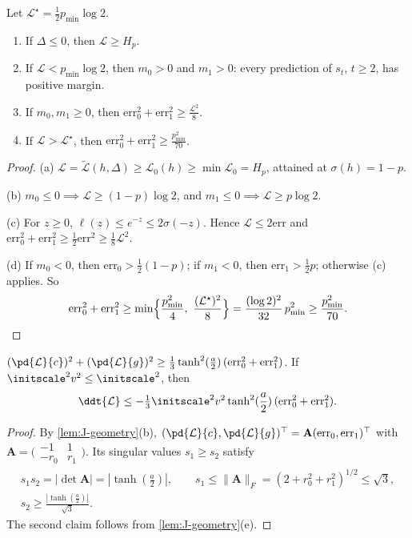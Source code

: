 \begin{lemma}
\label{lem:J-levels}
Let $\mathcal L^\star=\frac{1}{2}p_{\min}\log2$.
\begin{enumerate}[label=(\alph*),leftmargin=*,itemsep=2pt,topsep=3pt]
\item If $\Delta\le0$, then $\mathcal L\ge H_p$.
\item If $\mathcal L<p_{\min}\log2$, then $m_0>0$ and $m_1>0$: every prediction of $s_t$, $t\ge2$, has positive margin.
\item If $m_0,m_1\ge0$, then $\mathrm{err}_0^2+\mathrm{err}_1^2\ge \frac{\mathcal L^2}{8}$.
\item If $\mathcal L>\mathcal L^\star$, then $\mathrm{err}_0^2+\mathrm{err}_1^2\ge \frac{p_{\min}^2}{70}$.
\end{enumerate}
\end{lemma}

\begin{proof}
(a) $\mathcal L=\tilde{\mathcal L}( h,\Delta)\ge \mathcal L_0( h)\ge\min \mathcal L_0=H_p$, attained at $\sigma( h)=1-p$.

(b) $m_0\le0\implies \mathcal L\ge(1-p)\log2$, and $m_1\le0\implies \mathcal L\ge p\log2$.

(c) For $z\ge0$, $\ell(z)\le e^{-z}\le2\sigma(-z)$. Hence $\mathcal L\le2\mathrm{err}$ and $\mathrm{err}_0^2+\mathrm{err}_1^2\ge\frac{1}{2}\mathrm{err}^2\ge\frac{1}{8}\mathcal L^2$.

(d) If $m_0<0$, then $\mathrm{err}_0>\frac{1}{2}(1-p)$; if $m_1<0$, then $\mathrm{err}_1>\frac{1}{2}p$; otherwise (c) applies. So
\[
 \mathrm{err}_0^2+\mathrm{err}_1^2\ge\min\Bigl\{\frac{p_{\min}^2}{4},\ \frac{(\mathcal L^\star)^2}{8}\Bigr\}=\frac{(\log2)^2}{32}\,p_{\min}^2\ge\frac{p_{\min}^2}{70}.
\qedhere
\]
\end{proof}

\begin{lemma}
\label{lem:J-gradient}
$( \pd{\mathcal L}{c})^2+( \pd{\mathcal L}{g})^2\ge\frac{1}{3}\tanh^2(\frac{a}{2})\,(\mathrm{err}_0^2+\mathrm{err}_1^2)$. If $\initscale^2v^2\le\initscale^2$, then
\[
 \ddt{\mathcal L}\le-\tfrac{1}{3}\initscale^2v^2\tanh^2(\frac{a}{2})\,(\mathrm{err}_0^2+\mathrm{err}_1^2).
\]
\end{lemma}

\begin{proof}
By \cref{lem:J-geometry}(b), $(\pd{\mathcal L}{c},\pd{\mathcal L}{g})^\top=\mathbf A(\mathrm{err}_0,\mathrm{err}_1)^\top$ with $\mathbf A=\bigl(\begin{smallmatrix}-1&1\\-r_0&r_1\end{smallmatrix}\bigr)$. Its singular values $s_1\ge s_2$
satisfy
\begin{gather*}
 s_1s_2=|\det\mathbf A|=|\tanh(\frac{a}{2})|,\qquad s_1\le\|\mathbf A\|_F=(2+r_0^2+r_1^2)^{1/2}\le\sqrt3,\\
 s_2\ge\frac{|\tanh(\frac{a}{2})|}{\sqrt3} .
\end{gather*}
The second claim follows from \cref{lem:J-geometry}(e).
\end{proof}

